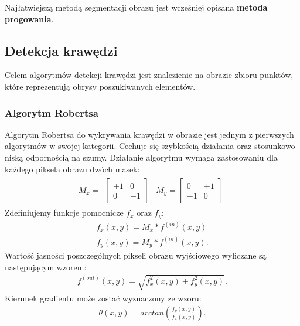 Najłatwiejszą metodą segmentacji obrazu jest wcześniej opisana \textbf{metoda progowania}.
\subsection{Detekcja krawędzi}
Celem algorytmów detekcji krawędzi jest znalezienie na obrazie zbioru punktów, które reprezentują obrysy poszukiwanych elementów. 

\subsubsection{Algorytm Robertsa}
Algorytm Robertsa do wykrywania krawędzi w obrazie jest jednym z pierwszych algorytmów w swojej kategorii. Cechuje się szybkością działania oraz stosunkowo niską odpornością na szumy. Działanie algorytmu wymaga zastosowaniu dla każdego piksela obrazu dwóch masek:
\begin{gather*}
  M_x = \begin{matrix}
    \begin{bmatrix}
      +1 & 0 \\
      0 & -1
    \end{bmatrix}
    &
    M_y = \begin{bmatrix}
      0 & +1 \\
      -1 & 0
    \end{bmatrix}
  \end{matrix}
\end{gather*}
Zdefiniujemy funkcje pomocnicze $f_x$ oraz $f_y$:
\begin{gather*}
  f_x(x, y) = M_x * f^{(in)}(x, y) \\
  f_y(x, y) = M_y * f^{(in)}(x, y).
\end{gather*}
Wartość jasności poszczególnych pikseli obrazu wyjściowego wyliczane są następującym wzorem:
\begin{gather*}
  f^{(out)}(x, y) = \sqrt{f_x^2(x, y)+f_{y}^2(x, y)}.
\end{gather*}
Kierunek gradientu może zostać wyznaczony ze wzoru:
\begin{gather*}
  \theta(x, y) = arctan(\frac{f_{y}(x, y)}{f_{x}(x, y)}).
\end{gather*}

